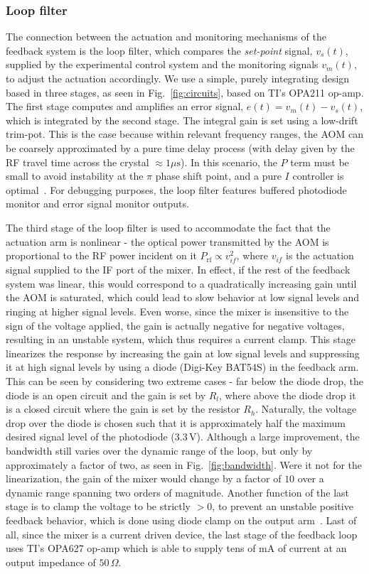 \documentclass[twocolumn,aps,pra,showpacs,preprintnumbers,bibnotes]{revtex4-1}
\begin{document}
\subsubsection{Loop filter}

The connection between the actuation and monitoring mechanisms of the feedback system is the loop filter, which compares the \textit{set-point} signal, $v_s(t)$, supplied by the experimental control system and the monitoring signals $v_m(t)$, to adjust the actuation accordingly.
We use a simple, purely integrating design based in three stages, as seen in Fig.~\ref{fig:circuits}, based on TI's OPA211 op-amp.
The first stage computes and amplifies an error signal, $e(t)=v_m(t)-v_s(t)$, which is integrated by the second stage.
The integral gain is set using a low-drift trim-pot.
This is the case because within relevant frequency ranges, the AOM can be coarsely approximated by a pure time delay process (with delay given by the RF travel time across the crystal $\approx 1 \mu\mathrm{s}$).
In this scenario, the $P$ term must be small to avoid instability at the $\pi$ phase shift point, and a pure $I$ controller is optimal~\cite{Skogestad2001}.
For debugging purposes, the loop filter features buffered photodiode monitor and error signal monitor outputs.

The third stage of the loop filter is used to accommodate the fact that the actuation arm is nonlinear - the optical power transmitted by the AOM is proportional to the RF power incident on it $P_{\mathrm{rf}}\propto v_{if}^2$, where $v_{if}$ is the actuation signal supplied to the IF port of the mixer.
In effect, if the rest of the feedback system was linear, this would correspond to a quadratically increasing gain until the AOM is saturated, which could lead to slow behavior at low signal levels and ringing at higher signal levels.
Even worse, since the mixer is insensitive to the sign of the voltage applied, the gain is actually negative for negative voltages, resulting in an unstable system, which thus requires a current clamp.
This stage linearizes the response by increasing the gain at low signal levels and suppressing it at high signal levels by using a diode (Digi-Key BAT54S) in the feedback arm.
This can be seen by considering two extreme cases - far below the diode drop, the diode is an open circuit and the gain is set by $R_l$, where above the diode drop it is a closed circuit where the gain is set by the resistor $R_h$.
Naturally, the voltage drop over the diode is chosen such that it is approximately half the maximum desired signal level of the photodiode ($3.3\,$V).
Although a large improvement, the bandwidth still varies over the dynamic range of the loop, but only by approximately a factor of two, as seen in Fig.~\ref{fig:bandwidth}.
Were it not for the linearization, the gain of the mixer would change by a factor of $10$ over a dynamic range spanning two orders of magnitude.
Another function of the last stage is to clamp the voltage to be strictly $>0$, to prevent an unstable positive feedback behavior, which is done using diode clamp on the output arm~\cite{Horowitz2015}.
Last of all, since the mixer is a current driven device, the last stage of the feedback loop uses TI's OPA627 op-amp which is able to supply tens of mA of current at an output impedance of $50\,\Omega$.
\end{document}
